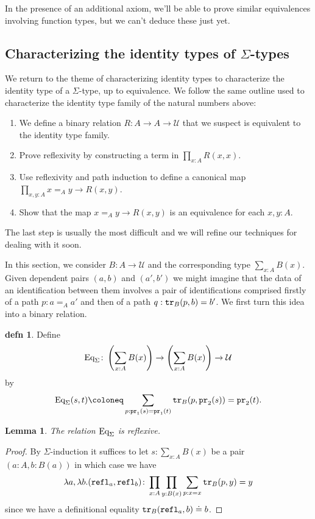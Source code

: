 \documentclass{amsart}
\theoremstyle{theorem}
\newtheorem*{lem}{Lemma}
\theoremstyle{definition}
\newtheorem*{defn}{defn}
\theoremstyle{remark}
\newcommand{\0}{\mathbbe{0}}
\newcommand{\1}{\mathbbe{1}}
\newcommand{\2}{\mathbbe{2}}
\newcommand{\3}{\mathbbe{3}}
\newcommand{\4}{\mathbbe{4}}
\newcommand{\term}[1]{{\textup{\texttt{#1}}}}
\newcommand{\pr}{\term{pr}}
\newcommand{\refl}{\term{refl}}
\newcommand{\tr}{\term{tr}}
\newcommand{\UU}{{\mathcal{U}}}
\newcommand{\Eq}{\textup{\text{Eq}}}
\begin{document}
In the presence of an additional axiom, we'll be able to prove similar equivalences involving function types, but we can't deduce these just yet.

\subsection*{Characterizing the identity types of \texorpdfstring{$\Sigma$}{Sigma}-types}

We return to the theme of characterizing identity types to characterize the identity type of a $\Sigma$-type, up to equivalence. We follow the same outline used to characterize the identity type family of the natural numbers above:
\begin{enumerate}
\item We define a binary relation $R \colon A \to A \to \UU$ that we suspect is equivalent to the identity type family.
\item Prove reflexivity by constructing a term in $\prod_{x :A} R(x,x)$.
\item Use reflexivity and path induction to define a canonical map $\prod_{x,y:A} x=_A y \to R(x,y)$.
\item Show that the map $x=_A y \to R(x,y)$ is an equivalence for each $x,y :A$.
\end{enumerate}
The last step is usually the most difficult and we will refine our techniques for dealing with it soon.

In this section, we consider $B \colon A \to \UU$ and the corresponding type $\sum_{x:A} B(x)$. Given dependent pairs $(a,b)$ and $(a',b')$ we might imagine that the data of an identification between them involves a pair of identifications comprised firstly of a path $p : a =_A a'$ and then of a path $q : \tr_B(p, b) = b'$. We first turn this idea into a binary relation.

\begin{defn} Define 
\[ \Eq_\Sigma \colon \left(\sum_{x:A}B(x)\right) \to \left(\sum_{x:A}B(x)\right) \to \UU\]
by 
\[ \Eq_\Sigma(s,t) \coloneq \sum_{p : \pr_1(s) = \pr_1(t)} \tr_B(p, \pr_2(s)) = \pr_2(t).\]
\end{defn}

\begin{lem} The relation $\Eq_\Sigma$ is reflexive.
\end{lem}
\begin{proof} By $\Sigma$-induction it suffices to let $s : \sum_{x:A}B(x)$ be a pair $(a : A, b : B(a))$ in which case we have
\[ \lambda a,\lambda b. (\refl_a,\refl_b) \colon \prod_{x :A}\prod_{y:B(x)} \sum_{p : x =x} \tr_B(p,y) = y\]
since we have a definitional equality $\tr_B(\refl_a,b) \doteq b$.
\end{proof}
\end{document}
